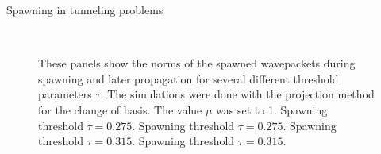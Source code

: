 \begin{chapter}{Spawning in tunneling problems}
\begin{figure}[h!]
{  } \\
  \caption[Norm of the spawned wavepackets during spawning and later propagation]{
  These panels show the norms of the spawned wavepackets during spawning and later propagation
  for several different threshold parameters $\tau$. The simulations were done with the projection
  method for the change of basis. The value $\mu$ was set to 1.
   Spawning threshold $\tau = 0.275$.
   Spawning threshold $\tau = 0.275$.
   Spawning threshold $\tau = 0.315$.
   Spawning threshold $\tau = 0.315$.
  \label{fig:spawn_propag_project_K100_bs1_norms}
  }
\end{figure}



\end{chapter}
